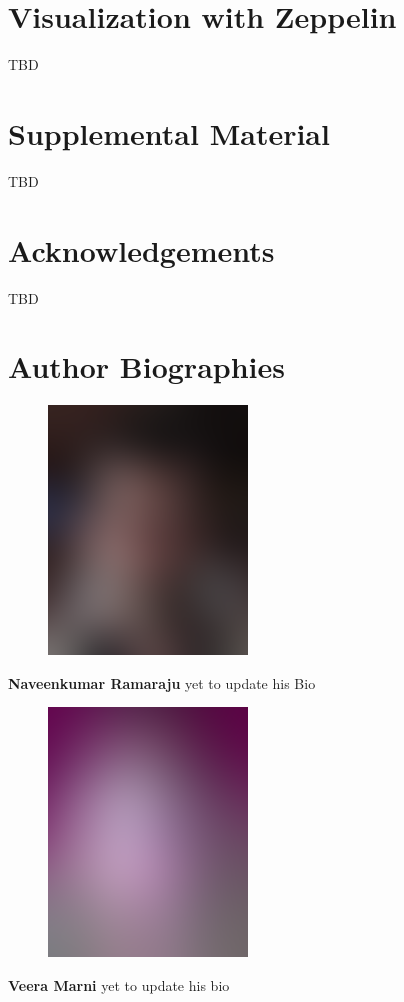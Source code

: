 \documentclass[9pt,twocolumn,twoside]{../../styles/osajnl}
\begin{document}
\section{Visualization with Zeppelin}
TBD

\section{Supplemental Material}
TBD

\section*{Acknowledgements}

TBD




 
\section*{Author Biographies}
\begingroup
\setlength\intextsep{0pt}
\begin{minipage}[t][3.2cm][t]{1.0\columnwidth} %
  \begin{figure}
    \includegraphics[width=0.25\columnwidth]{images/john_smith.eps}
  \end{figure}
  \noindent
  {\bfseries Naveenkumar Ramaraju} yet to update his Bio\end{minipage}
\begin{minipage}[t][3.2cm][t]{1.0\columnwidth} %
  \begin{figure}
    \includegraphics[width=0.25\columnwidth]{images/alice_smith.eps}
  \end{figure}
  \noindent
  {\bfseries Veera Marni} yet to update his bio
\end{minipage}
\end{document}

